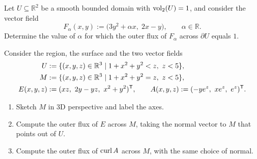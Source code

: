 \begin{exercise}
\label{ex:tuning_alpha_prescribed_flux}
Let $U \subseteq \mathbb{R}^2$ be a smooth bounded domain with $\operatorname{vol}_2(U) = 1$, and consider the
vector field
\[F_\alpha(x,y) := \big(3y^2 + \alpha x,\; 2x - y\big), \qquad \alpha \in \mathbb{R}.\]
Determine the value of $\alpha$ for which the outer flux of $F_\alpha$ across $\partial U$ equals
$1$.
\end{exercise}

\begin{exercise}
\label{ex:flux_truncated_paraboloid}
Consider the region, the surface and the two vector fields
\begin{align*}
  U &:= \{(x,y,z) \in \mathbb{R}^3 \mid 1+x^2+y^2 < z,\ z < 5\}, \\
  M &:= \{(x,y,z) \in \mathbb{R}^3 \mid 1+x^2+y^2 = z,\ z < 5\}, \\
  E(x,y,z) &:= (xz,\ 2y-yz,\ x^2+y^2)^{\mathsf{T}}, \qquad
  A(x,y,z) := (-ye^z,\ xe^z,\ e^z)^{\mathsf{T}} .
\end{align*}
\begin{enumerate}[label=\textbf{(\alph*)}]
  \item Sketch $M$ in 3D perspective and label the axes.
  \item Compute the outer flux of $E$ across $M$, taking the normal vector to $M$ that points out
    of $U$.
  \item Compute the outer flux of $\operatorname{curl} A$ across $M$, with the same choice of normal.
\end{enumerate}
\end{exercise}

